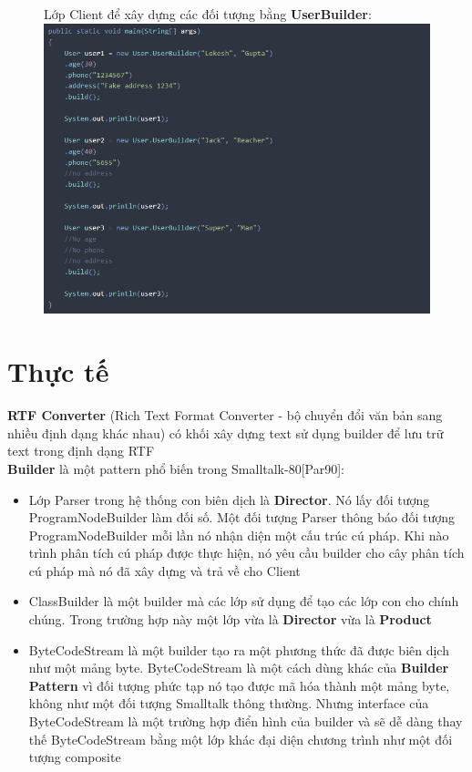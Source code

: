 \begin{figure}[!htb]
    Lớp Client để xây dựng các đối tượng bằng \textbf{UserBuilder}:
    \centering
    \includegraphics[width=\textwidth]{fig/Builder/main.png}
\end{figure}

\newpage

\section{Thực tế}
\textbf{RTF Converter} (Rich Text Format Converter - bộ chuyển đổi văn bản sang nhiều định dạng khác nhau) có khối xây dựng text sử dụng builder để lưu trữ text trong định dạng RTF\\[0.1in]
\textbf{Builder} là một pattern phổ biến trong Smalltalk-80[Par90]:
\begin{itemize}
    \item Lớp Parser trong hệ thống con biên dịch là \textbf{Director}. Nó lấy đối tượng ProgramNodeBuilder làm đối số. Một đối tượng Parser thông báo đối tượng  ProgramNodeBuilder mỗi lần nó nhận diện một cấu trúc cú pháp. Khi nào trình phân tích cú pháp được thực hiện, nó yêu cầu builder cho cây phân tích cú pháp mà nó đã xây dựng và trả về cho Client
    \item ClassBuilder là một builder mà các lớp sử dụng để tạo các lớp con cho chính chúng. Trong trường hợp này một lớp vừa là \textbf{Director} vừa là \textbf{Product}
    \item ByteCodeStream là một builder tạo ra một phương thức đã được biên dịch như một mảng byte. ByteCodeStream là một cách dùng khác của \textbf{Builder Pattern} vì đối tượng phức tạp nó tạo được mã hóa thành một mảng byte, không như một đối tượng Smalltalk thông thường. Nhưng interface của ByteCodeStream là một trường hợp điển hình của builder và sẽ dễ dàng thay thế ByteCodeStream bằng một lớp khác đại diện chương trình như một đối tượng composite
\end{itemize}